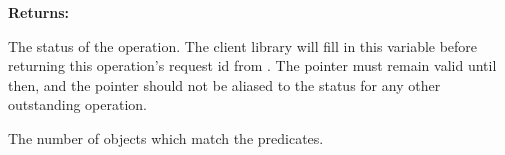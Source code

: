 \noindent\textbf{Returns:}
\begin{description}[labelindent=\widthof{{\code{status}}},leftmargin=*,noitemsep,nolistsep,align=right]
\item[\code{status}] The status of the operation.  The client library will fill in this variable before returning this operation's request id from .  The pointer must remain valid until then, and the pointer should not be aliased to the status for any other outstanding operation.
\item[\code{count}] The number of objects which match the predicates.
\end{description}
